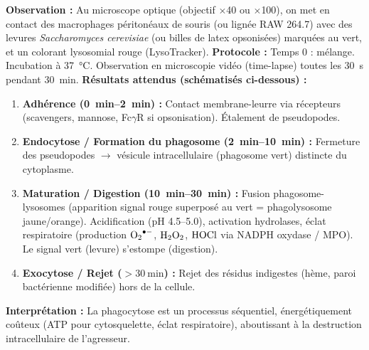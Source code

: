 \documentclass[11pt]{article}
\newcommand{\cle}[1]{{\popxbold\color{popdark}#1}}
\begin{document}
\begin{experience}
\textbf{Observation :} Au microscope optique (objectif $\times$40 ou $\times$100), on met en contact des macrophages péritonéaux de souris (ou lignée RAW 264.7) avec des levures \emph{Saccharomyces cerevisiae} (ou billes de latex opsonisées) marquées au vert, et un colorant lysosomial rouge (LysoTracker).
\textbf{Protocole :} Temps 0 : mélange. Incubation à \SI{37}{\celsius}. Observation en microscopie vidéo (time-lapse) toutes les \SI{30}{\second} pendant \SI{30}{\minute}.
\textbf{Résultats attendus (schématisés ci-dessous) :}
\begin{enumerate}
    \item \textbf{Adhérence (\SIrange{0}{2}{\minute}) :} Contact membrane-leurre via récepteurs (scavengers, mannose, Fc$\gamma$R si opsonisation). Étalement de pseudopodes.
    \item \textbf{Endocytose / Formation du phagosome (\SIrange{2}{10}{\minute}) :} Fermeture des pseudopodes $\rightarrow$ vésicule intracellulaire (phagosome vert) distincte du cytoplasme.
    \item \textbf{Maturation / Digestion (\SIrange{10}{30}{\minute}) :} Fusion phagosome-lysosomes (apparition signal rouge superposé au vert = phagolysosome jaune/orange). Acidification (pH \numrange{4,5}{5,0}), activation hydrolases, \cle{éclat respiratoire} (production $\ce{O2^{.-}}$, $\ce{H2O2}$, $\ce{HOCl}$ via NADPH oxydase / MPO). Le signal vert (levure) s'estompe (digestion).
    \item \textbf{Exocytose / Rejet ($> \SI{30}{\minute}$) :} Rejet des résidus indigestes (hème, paroi bactérienne modifiée) hors de la cellule.
\end{enumerate}
\textbf{Interprétation :} La phagocytose est un processus séquentiel, énergétiquement coûteux (ATP pour cytosquelette, éclat respiratoire), aboutissant à la destruction intracellulaire de l'agresseur.
\end{experience}
\end{document}
